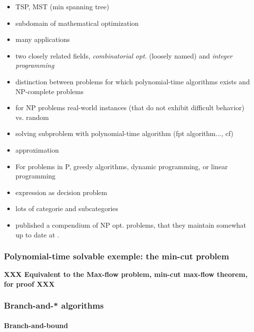 	\begin{itemize}
		\item TSP, MST (min spanning tree)
		\item subdomain of mathematical optimization
		\item many applications
		
		\item two closely related fields, \emph{combinatorial opt.} (loosely named) and \emph{integer programming}

		\item distinction between problems for which polynomial-time algorithms exists and NP-complete problems
		\item for NP problems real-world instances (that do not exhibit difficult behavior) vs. random
		\item solving subproblem with polynomial-time algorithm (fpt algorithm..., cf)
		\item approximation

		\item For problems in P, greedy algorithms, dynamic programming, or linear programming

		\item expression as decision problem

		\item lots of categorie and subcategories

		\item \textcite{crescenzi1995compendium} published a compendium of NP opt. problems, that they maintain somewhat up to date at \parencite{npcompendium}.
	\end{itemize}

		\subsubsection{Polynomial-time solvable exemple: the min-cut problem}
		\label{subsubsec:mincut}
			\textbf{XXX Equivalent to the Max-flow problem, min-cut max-flow theorem, \textcite[Section 6.1]{papadimitriou1982combinatorial} for proof XXX}
		
		\subsubsection{Branch-and-* algorithms}
		\label{subsec:bnsalgo}

			\paragraph{Branch-and-bound}

